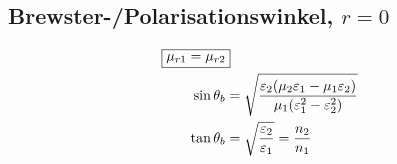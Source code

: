 \subsection{Brewster-/Polarisationswinkel, $r=0$}
\begin{align*}
    \Aboxed{\mu_{r1}=\mu_{r2}}                                                                                                    \\
    \sin\theta_b & = \sqrt{\frac{\varepsilon_2(\mu_2\varepsilon_1 - \mu_1\varepsilon_2)}{\mu_1(\varepsilon_1^2-\varepsilon_2^2)}} \\
    \tan\theta_b & = \sqrt{\frac{\varepsilon_2}{\varepsilon_1}} = \frac{n_2}{n_1}
\end{align*}
